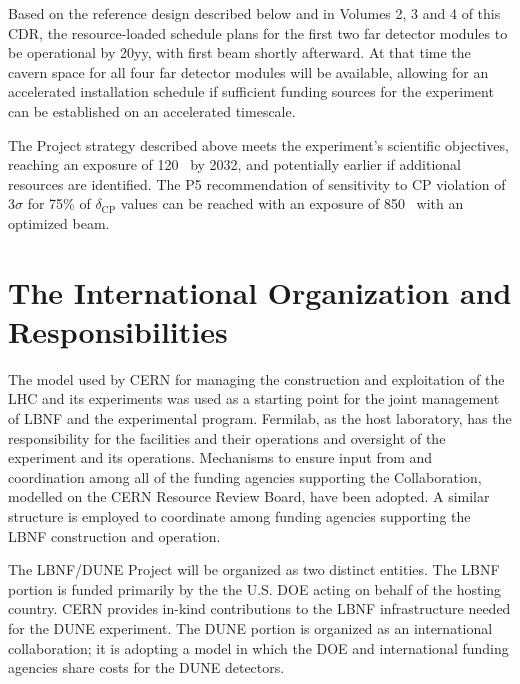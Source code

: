 Based on the reference design described below and in Volumes 2, 3 and 4 of this %
CDR, the resource-loaded schedule %
plans for the first two  far detector modules to be
operational by 20yy, %
with first beam shortly afterward.  At that time the cavern 
space for all four  far detector modules will be available, allowing for 
an accelerated installation schedule if sufficient funding sources for
the experiment can be established on an accelerated timescale.  

\vspace{6pt}
The Project strategy described above meets the experiment's scientific objectives,
 reaching an exposure of 
\num{120}~\ktMWyr{} by 2032, and potentially earlier if additional resources are identified. 
The P5 recommendation of sensitivity to CP violation of 3$\sigma$ for 75\% of $\delta_\text{CP}$
values can be reached with an exposure of \num{850}~\ktMWyr{} with an optimized beam.

\section{The International Organization and Responsibilities}

The %
model used by CERN for managing the construction and exploitation of the LHC and its experiments was used as a starting point for the joint management of LBNF and the experimental program.  Fermilab, as the host laboratory, has the responsibility for the facilities and their operations 
and oversight of the experiment and its operations.  Mechanisms to ensure input from and coordination among all of the funding agencies supporting the Collaboration, modelled on the CERN Resource Review Board, have been adopted. %
A similar structure is employed to coordinate among funding agencies supporting the LBNF construction and operation.  

The LBNF/DUNE Project will be organized as two distinct entities. The LBNF portion is funded primarily
by the the U.S. DOE acting on behalf of the hosting country.  CERN provides in-kind contributions to the LBNF infrastructure needed for the DUNE experiment. The DUNE portion is organized
as an international collaboration; it is adopting a model in which the DOE and international funding agencies share costs %
for the DUNE detectors.

